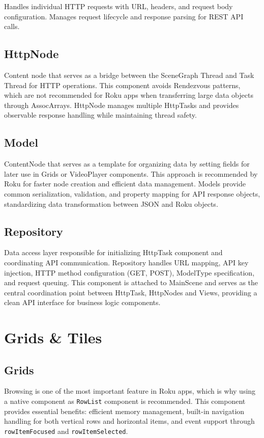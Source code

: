 \documentclass[11pt,letterpaper]{article}
\begin{document}
Handles individual HTTP requests with URL, headers, and request body configuration. Manages request lifecycle and response parsing for REST API calls.

\subsection{HttpNode}
\label{sec:HttpNode}

Content node that serves as a bridge between the SceneGraph Thread and Task Thread for HTTP operations. This component avoids Rendezvous patterns, which are not recommended for Roku apps when transferring large data objects through AssocArrays. HttpNode manages multiple HttpTasks and provides observable response handling while maintaining thread safety.

\subsection{Model}
\label{sec:model}

ContentNode that serves as a template for organizing data by setting fields for later use in Grids or VideoPlayer components. This approach is recommended by Roku for faster node creation and efficient data management. Models provide common serialization, validation, and property mapping for API response objects, standardizing data transformation between JSON and Roku objects.

\subsection{Repository}
\label{sec:repository}

Data access layer responsible for initializing HttpTask component and coordinating API communication. Repository handles URL mapping, API key injection, HTTP method configuration (GET, POST), ModelType specification, and request queuing. This component is attached to MainScene and serves as the central coordination point between HttpTask, HttpNodes and Views, providing a clean API interface for business logic components.

\section{Grids \& Tiles}
\subsection{Grids}
Browsing is one of the most important feature in Roku apps, which is why using a native component as \texttt{RowList} component is recommended. This component provides essential benefits: efficient memory management, built-in navigation handling for both vertical rows and horizontal items, and event support through \texttt{rowItemFocused} and \texttt{rowItemSelected}.
\end{document}
